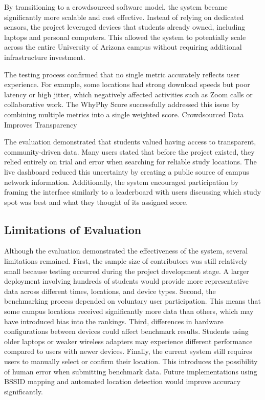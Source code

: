 \documentclass[sigconf]{acmart}
\begin{document}
By transitioning to a crowdsourced software model, the system became significantly more scalable and cost effective. Instead of relying on dedicated sensors, the project leveraged devices that students already owned, including laptops and personal computers. This allowed the system to potentially scale across the entire University of Arizona campus without requiring additional infrastructure investment.

The testing process confirmed that no single metric accurately reflects user experience. For example, some locations had strong download speeds but poor latency or high jitter, which negatively affected activities such as Zoom calls or collaborative work. The WhyPhy Score successfully addressed this issue by combining multiple metrics into a single weighted score.
Crowdsourced Data Improves Transparency

The evaluation demonstrated that students valued having access to transparent, community-driven data. Many users stated that before the project existed, they relied entirely on trial and error when searching for reliable study locations. The live dashboard reduced this uncertainty by creating a public source of campus network information. Additionally, the system encouraged participation by framing the interface similarly to a leaderboard with users discussing which study spot was best and what they thought of its assigned score.

\subsection{Limitations of Evaluation}
Although the evaluation demonstrated the effectiveness of the system, several limitations remained. First, the sample size of contributors was still relatively small because testing occurred during the project development stage. A larger deployment involving hundreds of students would provide more representative data across different times, locations, and device types. Second, the benchmarking process depended on voluntary user participation. This means that some campus locations received significantly more data than others, which may have introduced bias into the rankings. Third, differences in hardware configurations between devices could affect benchmark results. Students using older laptops or weaker wireless adapters may experience different performance compared to users with newer devices. Finally, the current system still requires users to manually select or confirm their location. This introduces the possibility of human error when submitting benchmark data. Future implementations using BSSID mapping and automated location detection would improve accuracy significantly.
\end{document}
